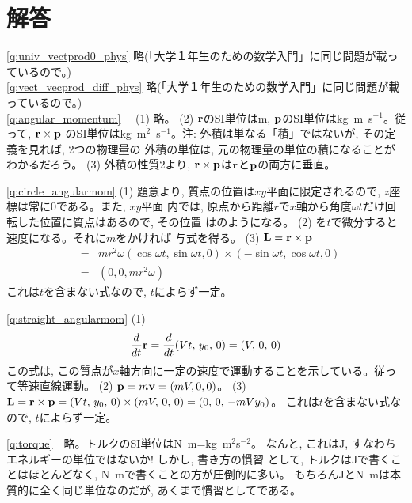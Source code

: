 \section{解答}

\ref{q:univ_vectprod0_phys} 略(「大学１年生のための数学入門」に同じ問題が載っているので。)\\

\ref{q:vect_vecprod_diff_phys} 略(「大学１年生のための数学入門」に同じ問題が載っているので。)\\

\ref{q:angular_momentum}　
(1) 略。
(2) ${\bf r}$のSI単位はm, ${\bf p}$のSI単位はkg~m~s$^{-1}$。従って, ${\bf r}\times{\bf p}$
のSI単位はkg~m$^2$~s$^{-1}$。注: 外積は単なる「積」ではないが, その定義を見れば, 2つの物理量の
外積の単位は, 元の物理量の単位の積になることがわかるだろう。
(3) 外積の性質2より, ${\bf r}\times{\bf p}$は${\bf r}$と${\bf p}$の両方に垂直。
\mv

\ref{q:circle_angularmom}
(1) 題意より, 質点の位置は$xy$平面に限定されるので, $z$座標は常に0である。また, $xy$平面
内では, 原点から距離$r$で$x$軸から角度$\omega t$だけ回転した位置に質点はあるので, その位置
はのようになる。
(2) を$t$で微分すると速度になる。それに$m$をかければ
与式を得る。
(3) ${\bf L}={\bf r}\times{\bf p}$
\begin{eqnarray*}
&=&mr^2\omega(\cos \omega t, \sin \omega t, 0)
      \times(-\sin \omega t, \cos \omega t, 0)\\
&=&(0, 0, mr^2\omega)
\end{eqnarray*}
これは$t$を含まない式なので, $t$によらず一定。
\mv

\ref{q:straight_angularmom}
(1)
\begin{eqnarray*}\frac{d}{dt}{\bf r}=\frac{d}{dt}(Vt,\, y_0,\, 0)=(V,\, 0,\, 0)\end{eqnarray*}
この式は, この質点が$x$軸方向に一定の速度で運動することを示している。従って等速直線運動。
(2) ${\bf p}=m{\bf v}=(mV, 0, 0)$。
(3) ${\bf L}={\bf r}\times{\bf p}=(Vt,\, y_0,\, 0)\times(mV,\, 0,\, 0)
       =(0,\, 0,\, -mVy_0)$。
これは$t$を含まない式なので, $t$によらず一定。
\mv

\ref{q:torque}　略。トルクのSI単位はN~m=kg~m$^2$s$^{-2}$。
なんと, これはJ, すなわちエネルギーの単位ではないか! しかし, 書き方の慣習
として, トルクはJで書くことはほとんどなく, N~mで書くことの方が圧倒的に多い。
もちろんJとN~mは本質的に全く同じ単位なのだが, あくまで慣習としてである。
\vspace{0.2cm}

